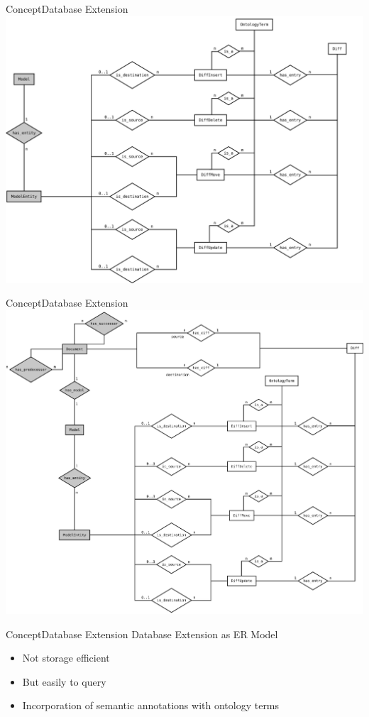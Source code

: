 \begin{frame}{Concept}{Database Extension}
	\centering
	\includegraphics[width=\linewidth,height=\textheight,keepaspectratio]{figures/er-part-3.pdf}
\end{frame}

\begin{frame}{Concept}{Database Extension}
	\centering
	\includegraphics[width=\linewidth,height=\textheight,keepaspectratio]{../tex/resources/db-concept-er.pdf}
\end{frame}

\begin{frame}{Concept}{Database Extension}
	{\Large Database Extension as ER Model}
	\\[2.5em]
	\begin{itemize}
		\item Not storage efficient
		\item But easily to query
		\item Incorporation of semantic annotations with ontology terms
	\end{itemize}
\end{frame}

